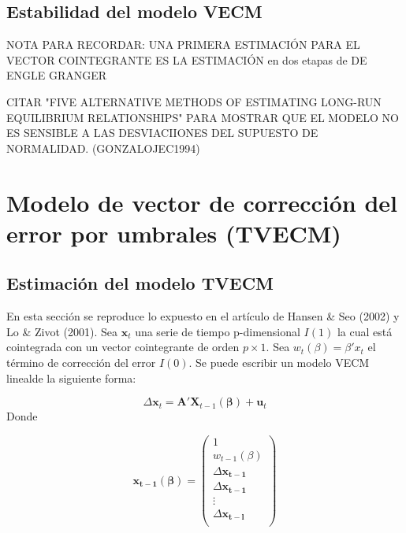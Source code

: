 \documentclass[12pt, twoside]{book}\usepackage[]{graphicx}\usepackage[]{color}
\numberwithin{equation}{section}
\numberwithin{theorem}{section}
\numberwithin{teorema}{section}
\numberwithin{defi}{section}
\numberwithin{prop}{section}
\numberwithin{defi}{section}
\theoremstyle{plain}
\begin{document}
\subsection{Estabilidad del modelo VECM}

NOTA PARA RECORDAR: UNA PRIMERA ESTIMACIÓN PARA EL VECTOR COINTEGRANTE ES LA ESTIMACIÓN en dos etapas de DE ENGLE GRANGER


CITAR "FIVE ALTERNATIVE METHODS OF ESTIMATING LONG-RUN EQUILIBRIUM RELATIONSHIPS" PARA MOSTRAR QUE EL MODELO NO ES SENSIBLE A LAS DESVIACIIONES DEL SUPUESTO DE NORMALIDAD. (GONZALOJEC1994)

\section{Modelo de vector de corrección del error por umbrales (TVECM)}
\subsection{Estimación del modelo TVECM}

En esta sección se reproduce lo expuesto en el artículo de Hansen \& Seo (2002) y Lo \& Zivot (2001). Sea $\mathbf{x}_{t}$ una serie de tiempo p-dimensional $I(1)$ la cual está cointegrada con un vector cointegrante de orden $p\times 1$. Sea $w_{t}(\beta)=\beta'x_{t}$ el término de corrección del error $I(0)$. Se puede escribir un modelo VECM linealde la siguiente forma: 

\begin{equation}
\Delta \mathbf{x}_{t} = \mathbf{A'X}_{t-1}(\boldsymbol{\beta})+\mathbf{u}_{t}
\end{equation}
Donde 

\begin{equation}
\mathbf{x_{t-1}}(\boldsymbol{\beta}) = \left(\begin{array}{c} 1 \\ w_{t-1}(\beta) \\ %
                                                            \Delta \mathbf{x_{t-1}} \\ %
                                                            \Delta \mathbf{x_{t-1}} \\ %
                                                            \vdots \\ %
                                                            \Delta \mathbf{x_{t-l}} \\ %
                                                            \end{array}\right)
\end{equation}
\end{document}
